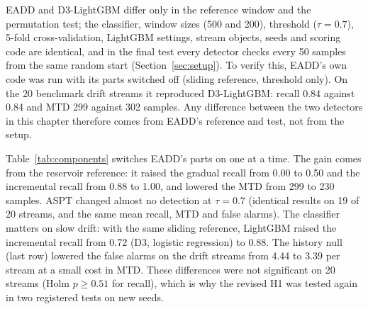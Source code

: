 EADD and D3-LightGBM differ only in the reference window and the permutation test; the classifier, window sizes (500 and 200), threshold ($\tau = 0.7$), 5-fold cross-validation, LightGBM settings, stream objects, seeds and scoring code are identical, and in the final test every detector checks every 50 samples from the same random start (Section~\ref{sec:setup}). To verify this, EADD's own code was run with its parts switched off (sliding reference, threshold only). On the 20 benchmark drift streams it reproduced D3-LightGBM: recall 0.84 against 0.84 and MTD 299 against 302 samples. Any difference between the two detectors in this chapter therefore comes from EADD's reference and test, not from the setup.

Table~\ref{tab:components} switches EADD's parts on one at a time. The gain comes from the reservoir reference: it raised the gradual recall from 0.00 to 0.50 and the incremental recall from 0.88 to 1.00, and lowered the MTD from 299 to 230 samples. ASPT changed almost no detection at $\tau = 0.7$ (identical results on 19 of 20 streams, and the same mean recall, MTD and false alarms). The classifier matters on slow drift: with the same sliding reference, LightGBM raised the incremental recall from 0.72 (D3, logistic regression) to 0.88. The history null (last row) lowered the false alarms on the drift streams from 4.44 to 3.39 per stream at a small cost in MTD. These differences were not significant on 20 streams (Holm $p \geq 0.51$ for recall), which is why the revised H1 was tested again in two registered tests on new seeds.

